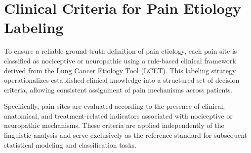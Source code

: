 \documentclass[preprint,12pt,authoryear]{elsarticle}
\begin{document}
\begin{table}[H]
\centering
{}
\caption{Cross-model summary of MANOVA statistics and Cronbach's alpha under the optimal cut-off protocol for each dataset. F(PL) denotes F(Pain Level), F(PS) denotes F(Pain~$\times$~Sex), and $\alpha$ values refer to the overall interference alpha within each stratum and sex group.\label{tab:app_summary}}
\end{table}


\section{Clinical Criteria for Pain Etiology Labeling\label{sec:appendix_lcet}}
To ensure a reliable ground-truth definition of pain etiology, each pain site is classified as nociceptive or neuropathic using a rule-based clinical framework derived from the Lung Cancer Etiology Tool (LCET). This labeling strategy operationalizes established clinical knowledge into a structured set of decision criteria, allowing consistent assignment of pain mechanisms across patients.

Specifically, pain sites are evaluated according to the presence of clinical, anatomical, and treatment-related indicators associated with nociceptive or neuropathic mechanisms. These criteria are applied independently of the linguistic analysis and serve exclusively as the reference standard for subsequent statistical modeling and classification tasks.
\end{document}
